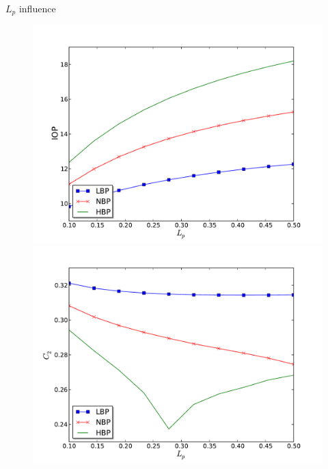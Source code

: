 \begin{frame}{$L_p$ influence}
\begin{figure}[H]
\begin{minipage}{0.45\linewidth}
\includegraphics[scale=0.27]{images/IOP_Lp}
\end{minipage}\hfill
\begin{minipage}{0.45\linewidth}
\includegraphics[scale=0.27]{images/C2_Lp}
\end{minipage}
\end{figure}

\end{frame}


